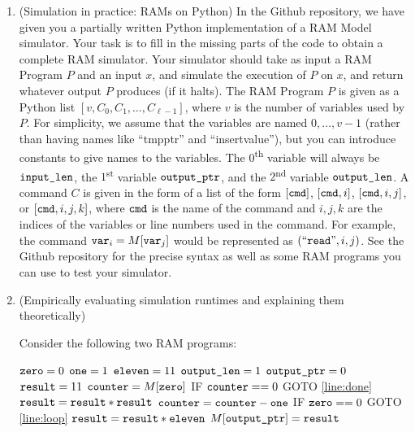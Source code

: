 \documentclass[11pt]{article}
\begin{document}
\begin{enumerate}
 
    \item (Simulation in practice: RAMs on Python)  
    In the Github repository, we have given you a partially written Python implementation of a RAM Model simulator.  Your task is to fill in the missing parts of the code to obtain a complete RAM simulator.
     Your simulator should take as input a RAM Program $P$ and an input $x$, and simulate the execution of $P$ on $x$, and return whatever output $P$ produces (if it halts).  The RAM Program $P$ is given as a Python list $[v,C_0,C_1,\ldots,C_{\ell-1}]$, where $v$ is the number of variables used by $P$.  For simplicity, we assume that the variables are named $0,\ldots,v-1$ (rather than having names like ``tmpptr'' and ``insertvalue''), but you can introduce constants to give names to the variables.  The $0$\textsuperscript{th} variable will always be $\texttt{input\_len}$, the $1$\textsuperscript{st} variable $\texttt{output\_ptr}$, and the $2$\textsuperscript{nd} variable $\texttt{output\_len}$.  A command $C$ is given in the form of a list of the form $[\texttt{cmd}]$, $[\texttt{cmd},i]$, $[\texttt{cmd},i,j]$, or $[\texttt{cmd},i,j,k]$, where $\texttt{cmd}$ is the name of the command and $i,j,k$ are the indices of the variables or line numbers used in the command.  For example,  the command $\texttt{var}_i = M[\texttt{var}_j]$ would be represented as $(``\texttt{read}",i,j)$.  See the Github repository for the precise syntax as well as some RAM programs you can use to test your simulator.

    \item (Empirically evaluating simulation runtimes and explaining them theoretically)  


Consider the following two RAM programs:

\begin{algorithm}[H]
\setcounter{AlgoLine}{-1}
$\texttt{zero} = 0$\;
$\texttt{one} = 1$\;
$\texttt{eleven} = 11$\;
$\texttt{output\_len} = 1$\;
$\texttt{output\_ptr} = 0$\;
$\texttt{result} = 11$\;
$\texttt{counter} = M[\texttt{zero}]$\;
\Indp
 IF $\texttt{counter} == 0$ GOTO \ref{line:done}\; \label{line:loop}
$\texttt{result} = \texttt{result} * \texttt{result}$\;
$\texttt{counter} = \texttt{counter} - \texttt{one}$\;
IF $\texttt{zero} == 0$ GOTO \ref{line:loop}\;
\Indm
$\texttt{result} = \texttt{result} * \texttt{eleven}$\; \label{line:done}
$M[\texttt{output\_ptr}]=\texttt{result}$\;
\end{algorithm}



\end{enumerate}
\end{document}
